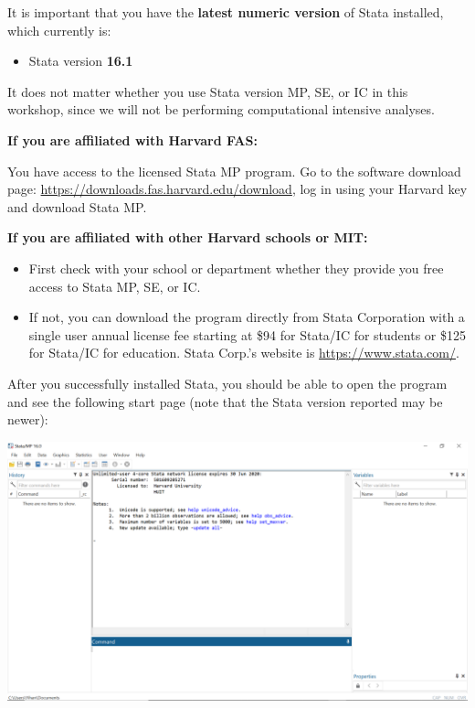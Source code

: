 \documentclass[
]{book}
\providecommand{\tightlist}{%
  \setlength{\itemsep}{0pt}\setlength{\parskip}{0pt}}
\begin{document}
It is important that you have the \textbf{latest numeric version} of Stata installed, which currently is:

\begin{itemize}
\tightlist
\item
  Stata version \textbf{16.1}
\end{itemize}

It does not matter whether you use Stata version MP, SE, or IC in this workshop, since we will not be performing computational intensive analyses.

\textbf{If you are affiliated with Harvard FAS:}

You have access to the licensed Stata MP program. Go to the software download page: \url{https://downloads.fas.harvard.edu/download}, log in using your Harvard key and download Stata MP.

\textbf{If you are affiliated with other Harvard schools or MIT:}

\begin{itemize}
\tightlist
\item
  First check with your school or department whether they provide you free access to Stata MP, SE, or IC.
\item
  If not, you can download the program directly from Stata Corporation with a single user annual license fee starting at \$94 for Stata/IC for students or \$125 for Stata/IC for education. Stata Corp.'s website is \url{https://www.stata.com/}.
\end{itemize}

After you successfully installed Stata, you should be able to open the program and see the following start page (note that the Stata version reported may be newer):

\includegraphics{Stata/StataInstall/images/Stata_start_panel.png}
\end{document}
